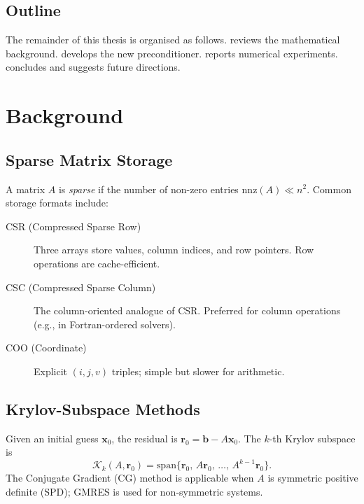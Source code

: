 \documentclass[
    12pt,
    a4paper,
    twoside,           %
    openright          %
]{book}
\begin{document}
\section{Outline}
\label{sec:intro_outline}

The remainder of this thesis is organised as follows.
 reviews the mathematical background.
 develops the new preconditioner.
 reports numerical experiments.
 concludes and suggests future directions.


\chapter{Background}
\label{chap:background}

\section{Sparse Matrix Storage}
\label{sec:storage}

A matrix $A$ is \emph{sparse} if the number of non-zero entries
$\mathrm{nnz}(A) \ll n^2$.  Common storage formats include:

\begin{description}
    \item[CSR (Compressed Sparse Row)] Three arrays store values, column
        indices, and row pointers. Row operations are cache-efficient.
    \item[CSC (Compressed Sparse Column)] The column-oriented analogue of CSR.
        Preferred for column operations (e.g., in Fortran-ordered solvers).
    \item[COO (Coordinate)] Explicit $(i, j, v)$ triples; simple but slower
        for arithmetic.
\end{description}

\section{Krylov-Subspace Methods}
\label{sec:krylov}

Given an initial guess $\mathbf{x}_0$, the residual is
$\mathbf{r}_0 = \mathbf{b} - A\mathbf{x}_0$.  The $k$-th Krylov subspace is
\[
    \mathcal{K}_k(A, \mathbf{r}_0)
    = \mathrm{span}\{\mathbf{r}_0,\, A\mathbf{r}_0,\, \ldots,\,
                     A^{k-1}\mathbf{r}_0\}.
\]
The Conjugate Gradient (CG) method is applicable when $A$ is
symmetric positive definite (SPD); GMRES is used for non-symmetric systems.
\end{document}

